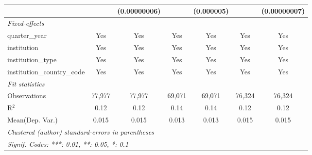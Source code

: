 \begin{tabular}{lcccccc}
                                      &               & (0.00000006)  &         & (0.000005) &               & (0.00000007)\\   
   \midrule
   \emph{Fixed-effects}\\
   quarter\_year                      & Yes           & Yes           & Yes     & Yes        & Yes           & Yes\\  
   institution                        & Yes           & Yes           & Yes     & Yes        & Yes           & Yes\\  
   institution\_type                  & Yes           & Yes           & Yes     & Yes        & Yes           & Yes\\  
   institution\_country\_code         & Yes           & Yes           & Yes     & Yes        & Yes           & Yes\\  
   \midrule
   \emph{Fit statistics}\\
   Observations                       & 77,977        & 77,977        & 69,071  & 69,071     & 76,324        & 76,324\\  
   R$^2$                              & 0.12          & 0.12          & 0.14    & 0.14       & 0.12          & 0.12\\  
Mean(Dep. Var.) & 0.015 & 0.015 & 0.013 & 0.013 & 0.015 & 0.015 \\
   \midrule \midrule
   \multicolumn{7}{l}{\emph{Clustered (author) standard-errors in parentheses}}\\
   \multicolumn{7}{l}{\emph{Signif. Codes: ***: 0.01, **: 0.05, *: 0.1}}\\
\end{tabular}
\par\endgroup
